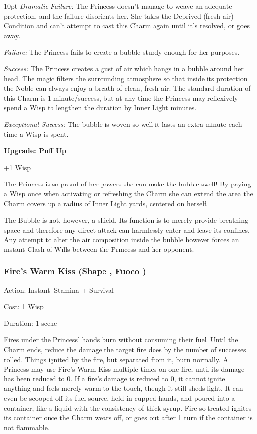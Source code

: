 \begin{myindentpar}{10pt}    \emph{Dramatic Failure:} The Princess doesn't manage to weave an adequate protection, and the failure disorients her. She takes the Deprived (fresh air) Condition and can't attempt to cast this Charm again until it's resolved, or goes away.

\emph{Failure:} The Princess fails to create a bubble sturdy enough for her purposes.

\emph{Success:} The Princess creates a gust of air which hangs in a bubble around her head. The magic filters the surrounding atmosphere so that inside its protection the Noble can always enjoy a breath of clean, fresh air. The standard duration of this Charm is 1 minute/success, but at any time the Princess may reflexively spend a Wisp to lengthen the duration by Inner Light minutes.

\emph{Exceptional Success:} The bubble is woven so well it lasts an extra minute each time a Wisp is spent.

\textbf{Upgrade: Puff Up}

+1 Wisp

The Princess is so proud of her powers she can make the bubble swell! By paying a Wisp once when activating or refreshing the Charm she can extend the area the Charm covers up a radius of Inner Light yards, centered on herself.

The Bubble is not, however, a shield. Its function is to merely provide breathing space and therefore any direct attack can harmlessly enter and leave its confines. Any attempt to alter the air composition inside the bubble however forces an instant Clash of Wills between the Princess and her opponent.\end{myindentpar}


\subsubsection*{Fire's Warm Kiss (Shape \textbullet, Fuoco \textbullet)}

\noindent Action: Instant, Stamina + Survival

\noindent Cost: 1 Wisp

\noindent Duration: 1 scene

Fires under the Princess' hands burn without consuming their fuel. Until the Charm ends, reduce the damage the target fire does by the number of successes rolled. Things ignited by the fire, but separated from it, burn normally. A Princess may use Fire's Warm Kiss multiple times on one fire, until its damage has been reduced to 0. If a fire's damage is reduced to 0, it cannot ignite anything and feels merely warm to the touch, though it still sheds light. It can even be scooped off its fuel source, held in cupped hands, and poured into a container, like a liquid with the consistency of thick syrup. Fire so treated ignites its container once the Charm wears off, or goes out after 1 turn if the container is not flammable.

